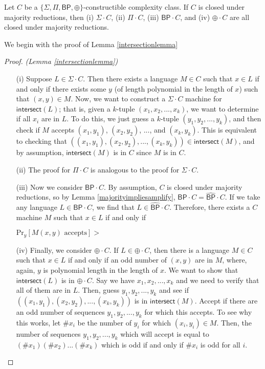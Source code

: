 \documentclass[11pt]{article}
\newcommand{\pr}{\text{Pr}}
\newcommand{\bp}{\textsf{BP}}
\newcommand{\strongbp}{\widehat{\textsf{BP}}}
\newcommand{\parity}{\oplus}
\newcommand{\intersect}{\textsf{intersect}}
\begin{document}
\begin{lemma}\label{amplifymainlemma}
Let $C$ be a \emph{$\{\Sigma,\Pi,\bp,\parity\}$}-constructible complexity class. If $C$ is closed under majority reductions, then (i) \emph{$\Sigma \cdot C$}, (ii) \emph{$\Pi \cdot C$}, (iii) \emph{$\bp \cdot C$}, and (iv) \emph{$\parity \cdot C$} are all closed under majority reductions.
\end{lemma}
We begin with the proof of Lemma \ref{intersectionlemma}
\begin{proof} \emph{(Lemma \ref{intersectionlemma})}
\begin{enumerate}
\item[(i)] Suppose $L \in \Sigma\cdot C$. Then there exists a language $M\in C$ such that $x \in L$ if and only if there exists some $y$ (of length polynomial in the length of $x$) such that $(x, y)\in M$. Now, we want to construct a $\Sigma \cdot C$ machine for $\intersect(L)$; that is, given a $k$-tuple $(x_1,x_2,...,x_k)$, we want to determine if all $x_i$ are in $L$. To do this, we just guess a $k$-tuple $(y_1,y_2,...,y_k)$, and then check if $M$ accepts $(x_1, y_1)$, $(x_2, y_2)$, ..., and $(x_k, y_k)$. This is equivalent to checking that $((x_1,y_1),(x_2,y_2),...,(x_k,y_k)) \in \intersect(M)$, and by assumption, $\intersect(M)$ is in $C$ since $M$ is in $C$.

\item[(ii)] The proof for $\Pi \cdot C$ is analogous to the proof for $\Sigma \cdot C$.

\item[(iii)] Now we consider $\bp \cdot C$. By assumption, $C$ is closed under majority reductions, so by Lemma \ref{majorityimpliesamplify}, $\bp \cdot C = \strongbp \cdot C$. If we take any language $L \in \bp \cdot C$, we find that $L \in \strongbp \cdot C$. Therefore, there exists a $C$ machine $M$ such that $x\in L$ if and only if
\begin{center}
$\displaystyle \pr_y [M(x,y)\text{ accepts}] > $
\end{center}

\item[(iv)] Finally, we consider $\parity \cdot C$. If $L \in \parity \cdot C$, then there is a language $M \in C$ such that $x\in L$ if and only if an odd number of $(x,y)$ are in $M$, where, again, $y$ is polynomial length in the length of $x$. We want to show that $\intersect(L)$ is in $\parity \cdot C$. Say we have $x_1,x_2,...,x_k$ and we need to verify that all of them are in $L$. Then, guess $y_1,y_2,...,y_k$ and see if $((x_1,y_1),(x_2,y_2),...,(x_k,y_k))$ is in $\intersect(M)$. Accept if there are an odd number of sequences $y_1,y_2,...,y_k$ for which this accepts. To see why this works, let $\# x_i$ be the number of $y_i$ for which $(x_i, y_i) \in M$. Then, the number of sequences $y_1,y_2,...,y_k$ which will accept is equal to $(\# x_1)(\# x_2)...(\# x_k)$ which is odd if and only if $\# x_i$ is odd for all $i$.
\end{enumerate}
\end{proof}
\end{document}
